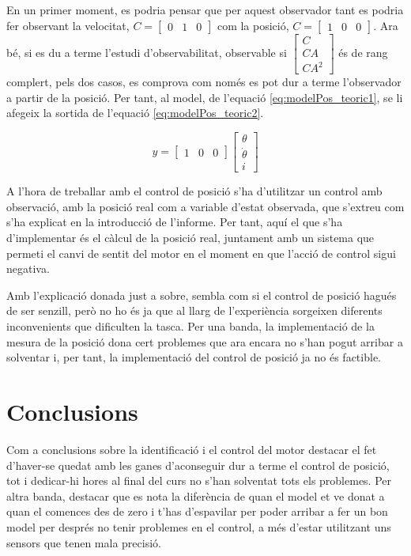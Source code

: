 \documentclass[12pt,a4paper,final,twoside,openright]{report}
\begin{document}
En un primer moment, es podria pensar que per aquest observador tant es podria fer observant la velocitat, $C=\begin{bmatrix}0 & 1 & 0\end{bmatrix}$ com la posició, $C =\begin{bmatrix}1 & 0 & 0\end{bmatrix}$. Ara bé, si es du a terme l'estudi d'observabilitat, observable si $\begin{bmatrix}C\\CA\\CA^2\end{bmatrix}$ és de rang complert, pels dos casos, es comprova com només es pot dur a terme l'observador a partir de la posició. Per tant, al model, de l'equació \eqref{eq:modelPos_teoric1}, se li afegeix la sortida de l'equació \eqref{eq:modelPos_teoric2}.

\begin{equation}
y = \begin{bmatrix}
1 & 0 & 0
\end{bmatrix} \begin{bmatrix}
\theta\\
\dot{\theta}\\
i
\end{bmatrix}\label{eq:modelPos_teoric2}
\end{equation}

A l'hora de treballar amb el control de posició s'ha d'utilitzar un control amb observació, amb la posició real com a variable d'estat observada, que s'extreu com s'ha explicat en la introducció de l'informe. Per tant, aquí el que s'ha d'implementar és el càlcul de la posició real, juntament amb un sistema que permeti el canvi de sentit del motor en el moment en que l'acció de control sigui negativa.

Amb l'explicació donada just a sobre, sembla com si el control de posició hagués de ser senzill, però no ho és ja que al llarg de l'experiència sorgeixen diferents inconvenients que dificulten la tasca. Per una banda, la implementació de la mesura de la posició dona cert problemes que ara encara no s'han pogut arribar a solventar i, per tant, la implementació del control de posició ja no és factible.

\chapter{Conclusions}

Com a conclusions sobre la identificació i el control del motor destacar el fet d'haver-se quedat amb les ganes d'aconseguir dur a terme el control de posició, tot i dedicar-hi hores al final del curs no s'han solventat tots els problemes. Per altra banda, destacar que es nota la diferència de quan el model et ve donat a quan el comences des de zero i t'has d'espavilar per poder arribar a fer un bon model per després no tenir problemes en el control, a més d'estar utilitzant uns sensors que tenen mala precisió. 
\end{document}
